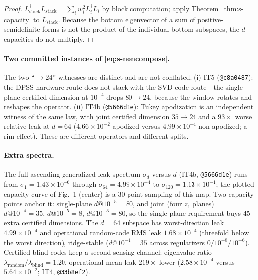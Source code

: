 \documentclass[10pt,onecolumn]{article}
\theoremstyle{plain}
\theoremstyle{definition}
\begin{document}
\begin{proof}
$L_{\mathrm{stack}}^\dagger L_{\mathrm{stack}}=\sum_i w_i^2 L_i^\dagger L_i$ by block
computation; apply Theorem~\ref{thm:s-capacity} to $L_{\mathrm{stack}}$. Because the
bottom eigenvector of a sum of positive-semidefinite forms is not the product of the
individual bottom subspaces, the $d$-capacities do not multiply.
\end{proof}

\paragraph{Two committed instances of \eqref{eq:s-noncompose}.} The two ``$\to24$''
witnesses are distinct and are not conflated. (i) IT5 (\texttt{@c8a0487}): the DPSS
hardware route does not stack with the SVD code route---the single-plane certified
dimension at $10^{-4}$ drops $80\to24$, because the window rotates and reshapes the
operator. (ii) IT4b (\texttt{@5666d1e}): Tukey apodization is an independent witness
of the same law, with joint certified dimension $35\to24$ and a $93\times$ worse
relative leak at $d=64$ ($4.66\times10^{-2}$ apodized versus $4.99\times10^{-4}$
non-apodized; a rim effect). These are different operators and different splits.

\paragraph{Extra spectra.} The full ascending generalized-leak spectrum $\sigma_d$
versus $d$ (IT4b, \texttt{@5666d1e}) runs from $\sigma_1=1.43\times10^{-6}$ through
$\sigma_{64}=4.99\times10^{-4}$ to $\sigma_{120}=1.13\times10^{-1}$; the plotted
capacity curve of Fig.~1 (center) is a $30$-point sampling of this map. Two capacity
points anchor it: single-plane $d@10^{-5}=80$, and joint (four $z_1$ planes)
$d@10^{-4}=35$, $d@10^{-5}=8$, $d@10^{-3}=80$, so the single-plane requirement buys
$45$ extra certified dimensions. The $d=64$ subspace has worst-direction leak
$4.99\times10^{-4}$ and operational random-code RMS leak $1.68\times10^{-4}$
(threefold below the worst direction), ridge-stable ($d@10^{-4}=35$ across
regularizers $0/10^{-8}/10^{-6}$). Certified-blind codes keep a second sensing
channel: eigenvalue ratio $\lambda_{\mathrm{random}}/\lambda_{\mathrm{blind}}=1.20$,
operational mean leak $219\times$ lower ($2.58\times10^{-4}$ versus
$5.64\times10^{-2}$; IT4, \texttt{@33b8ef2}).

\end{document}
